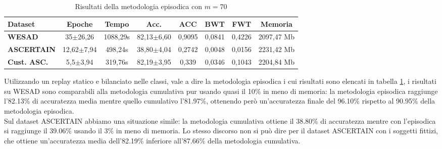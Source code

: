 \begin{table}[h]
\footnotesize
    \begin{tabular}{l|c|c|c|c|c|c|c}
        \textbf{Dataset} & \textbf{Epoche} & \textbf{Tempo} & \textbf{Acc.} & \textbf{ACC} & \textbf{BWT} & \textbf{FWT} & \textbf{Memoria}\\
        \hline
        \textbf{WESAD} & 35$\pm$26,26 & 1088,29s & 82,13$\pm$6,60 & 0,9095 & 0,0841 & 0,4226 & 2097,47 Mb\\
        \textbf{ASCERTAIN} & 12,62$\pm$7,94 & 498,24s & 38,80$\pm$4,04 & 0,2742 & 0,0048 & 0,0156 & 2231,42 Mb\\
        \textbf{Cust. ASC.} & 5,5$\pm$3,94 & 319,76s & 82,19$\pm$3,95 & 0,339 & 0,0346 & 0,1043 & 2204,84 Mb\\
    \end{tabular}
    \caption{Risultati della metodologia episodica con $m = 70$}
    \label{tab:resepisodic}
\end{table}
Utilizzando un replay statico e bilanciato nelle classi, vale a dire la metodologia episodica i cui risultati sono elencati in tabella \ref{tab:resepisodic}, i risultati su WESAD sono comparabili alla metodologia cumulativa pur usando quasi il 10\% in meno di memoria: la metodologia episodica raggiunge l'82.13\% di accuratezza media mentre quello cumulativo l'81.97\%, ottenendo però un'accuratezza finale del 96.10\% rispetto al 90.95\% della metodologia episodica.\\
Sul dataset ASCERTAIN abbiamo una situazione simile: la metodologia cumulativa ottiene il 38.80\% di accuratezza mentre con l'episodica si raggiunge il 39.06\% usando il 3\% in meno di memoria. Lo stesso discorso non si può dire per il dataset ASCERTAIN con i soggetti fittizi, che ottiene un'accuratezza media dell'82.19\% inferiore all'87.66\% della metodologia cumulativa.

